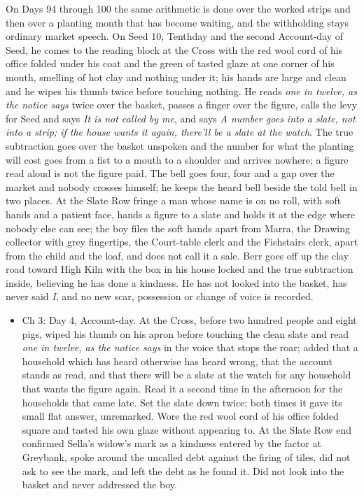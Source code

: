 \documentclass{design/chronicle}
\begin{document}
{On Days 94 through 100 the same arithmetic is done over the worked strips and then over a planting month that has become waiting, and the withholding stays ordinary market speech. On Seed 10, Tenthday and the second Account-day of Seed, he comes to the reading block at the Cross with the red wool cord of his office folded under his coat and the green of tasted glaze at one corner of his mouth, smelling of hot clay and nothing under it; his hands are large and clean and he wipes his thumb twice before touching nothing. He reads \emph{one in twelve, as the notice says} twice over the basket, passes a finger over the figure, calls the levy for Seed and says \emph{It is not called by me}, and says \emph{A number goes into a slate, not into a strip; if the house wants it again, there’ll be a slate at the watch}. The true subtraction goes over the basket unspoken and the number for what the planting will cost goes from a fist to a mouth to a shoulder and arrives nowhere; a figure read aloud is not the figure paid. The bell goes four, four and a gap over the market and nobody crosses himself; he keeps the heard bell beside the told bell in two places. At the Slate Row fringe a man whose name is on no roll, with soft hands and a patient face, hands a figure to a slate and holds it at the edge where nobody else can see; the boy files the soft hands apart from Marra, the Drawing collector with grey fingertips, the Court-table clerk and the Fishstairs clerk, apart from the child and the loaf, and does not call it a sale. Berr goes off up the clay road toward High Kiln with the box in his house locked and the true subtraction inside, believing he has done a kindness. He has not looked into the basket, has never said \emph{I}, and no new scar, possession or change of voice is recorded.

\begin{itemize}[leftmargin=1.4em,itemsep=1pt,topsep=3pt,parsep=0pt]

\item Ch 3: Day 4, Account-day. At the Cross, before two hundred people and eight pigs, wiped his thumb on his apron before touching the clean slate and read \emph{one in twelve, as the notice says} in the voice that stops the roar; added that a household which has heard otherwise has heard wrong, that the account stands as read, and that there will be a slate at the watch for any household that wants the figure again. Read it a second time in the afternoon for the households that came late. Set the slate down twice; both times it gave its small flat answer, unremarked. Wore the red wool cord of his office folded square and tasted his own glaze without appearing to. At the Slate Row end confirmed Sella’s widow’s mark as a kindness entered by the factor at Greybank, spoke around the uncalled debt against the firing of tiles, did not ask to see the mark, and left the debt as he found it. Did not look into the basket and never addressed the boy.


\end{itemize}}
\end{document}
